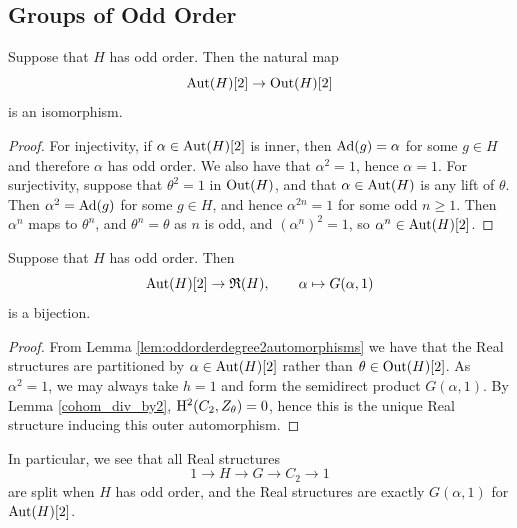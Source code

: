 \subsection{Groups of Odd Order}

\begin{lemma}\label{lem:oddorderdegree2automorphisms}
  Suppose that $H$ has odd order. Then the natural map
  \[
    \operatorname{Aut}(H)[2] \rightarrow \operatorname{Out}(H)[2]
  \]
  is an isomorphism.
\end{lemma}

\begin{proof}
  For injectivity, if $\alpha \in \operatorname{Aut}(H)[2]$ is inner, then $\operatorname{Ad}(g) = \alpha$ for some $g \in H$ and therefore $\alpha$ has odd order. We also have that $\alpha^2 = 1$, hence $\alpha = 1$. For surjectivity, suppose that $\theta^2 = 1$ in $\operatorname{Out}(H)$, and that $\alpha \in \operatorname{Aut}(H)$ is any lift of $\theta$. Then $\alpha^2 = \operatorname{Ad}(g)$ for some $g \in H$, and hence $\alpha^{2n} = 1$ for some odd $n \geq 1$. Then $\alpha^n$ maps to $\theta^n$, and $\theta^n = \theta$ as $n$ is odd, and $(\alpha^n)^2 = 1$, so $\alpha^n \in \operatorname{Aut}(H)[2]$.
\end{proof}

\begin{cor}\label{cor:oddorderRealstructures}
  Suppose that $H$ has odd order. Then
  \[
    \operatorname{Aut}(H)[2] \rightarrow {\mathfrak R}(H), \qquad \alpha \mapsto G(\alpha,1)
  \]
  is a bijection.
\end{cor}

\begin{proof}
  From Lemma \ref{lem:oddorderdegree2automorphisms} we have that the Real structures are partitioned by $\alpha \in \operatorname{Aut}(H)[2]$ rather than $\theta \in \operatorname{Out}(H)[2]$. As $\alpha^2 = 1$, we may always take $h = 1$ and form the semidirect product $G(\alpha, 1)$. By Lemma \ref{cohom_div_by2}, $\mathrm{H}^2(C_2, Z_{\theta}) = 0$, hence this is the unique Real structure inducing this outer automorphism.
\end{proof}

In particular, we see that all Real structures
\[
1 \rightarrow H \rightarrow G \rightarrow C_2 \rightarrow 1
\]
are split when $H$ has odd order, and the Real structures are exactly $G(\alpha, 1)$ for $\operatorname{Aut}(H)[2]$.

